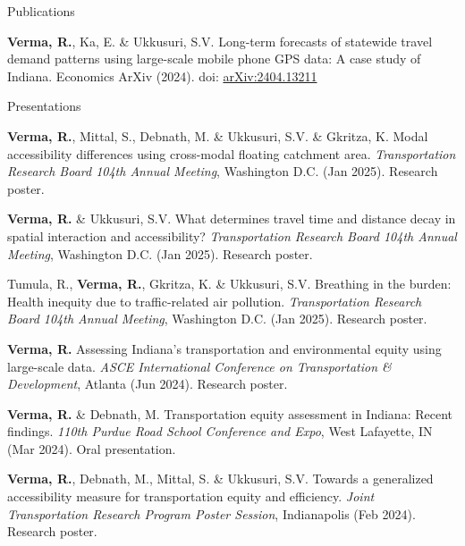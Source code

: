 \documentclass{CV} %
\begin{document}
\begin{rSection}{Publications}
\begin{etaremune}
        \item \textbf{Verma, R.}, Ka, E. \& Ukkusuri, S.V. Long-term forecasts of statewide travel demand patterns using large-scale mobile phone GPS data: A case study of Indiana. Economics ArXiv (2024). doi: \href{https://arxiv.org/abs/2404.13211}{arXiv:2404.13211}
    \end{etaremune}
\end{rSection}

\begin{rSection}{Presentations}
    \begin{etaremune}
        \item \textbf{Verma, R.}, Mittal, S., Debnath, M. \& Ukkusuri, S.V. \& Gkritza, K. Modal accessibility differences using cross-modal floating catchment area. \textit{Transportation Research Board 104th Annual Meeting}, Washington D.C. (Jan 2025). Research poster.
        
        \item \textbf{Verma, R.} \& Ukkusuri, S.V. What determines travel time and distance decay in spatial interaction and accessibility? \textit{Transportation Research Board 104th Annual Meeting}, Washington D.C. (Jan 2025). Research poster.

        \item Tumula, R., \textbf{Verma, R.}, Gkritza, K. \& Ukkusuri, S.V. Breathing in the burden: Health inequity due to traffic-related air pollution. \textit{Transportation Research Board 104th Annual Meeting}, Washington D.C. (Jan 2025). Research poster.
        
        \item \textbf{Verma, R.} Assessing Indiana's transportation and environmental equity using large-scale data. \textit{ASCE International Conference on Transportation \& Development}, Atlanta (Jun 2024). Research poster.

        \item \textbf{Verma, R.} \& Debnath, M. Transportation equity assessment in Indiana: Recent findings. \textit{110th Purdue Road School Conference and Expo}, West Lafayette, IN (Mar 2024). Oral presentation.
        
        \item \textbf{Verma, R.}, Debnath, M., Mittal, S. \& Ukkusuri, S.V. Towards a generalized accessibility measure for transportation equity and efficiency. \textit{Joint Transportation Research Program Poster Session}, Indianapolis (Feb 2024). Research poster.
        

\end{etaremune}
\end{rSection}
\end{document}
